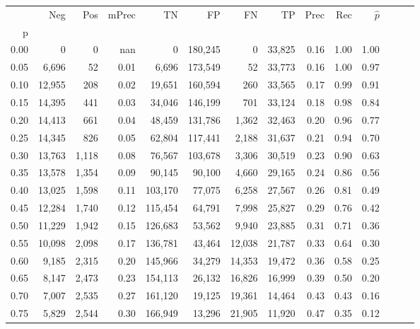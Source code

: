 \begin{tabular}{rrrrrrrrrrrrrr}
\toprule
{} &     Neg &    Pos & mPrec &       TN &       FP &      FN &      TP &  Prec &   Rec & $\hat{p}$ \\
p    &         &        &       &          &          &         &         &       &       &           \\
\midrule
0.00 &       0 &      0 &   nan &        0 &  180,245 &       0 &  33,825 &  0.16 &  1.00 &      1.00 \\
0.05 &   6,696 &     52 &  0.01 &    6,696 &  173,549 &      52 &  33,773 &  0.16 &  1.00 &      0.97 \\
0.10 &  12,955 &    208 &  0.02 &   19,651 &  160,594 &     260 &  33,565 &  0.17 &  0.99 &      0.91 \\
0.15 &  14,395 &    441 &  0.03 &   34,046 &  146,199 &     701 &  33,124 &  0.18 &  0.98 &      0.84 \\
0.20 &  14,413 &    661 &  0.04 &   48,459 &  131,786 &   1,362 &  32,463 &  0.20 &  0.96 &      0.77 \\
0.25 &  14,345 &    826 &  0.05 &   62,804 &  117,441 &   2,188 &  31,637 &  0.21 &  0.94 &      0.70 \\
0.30 &  13,763 &  1,118 &  0.08 &   76,567 &  103,678 &   3,306 &  30,519 &  0.23 &  0.90 &      0.63 \\
0.35 &  13,578 &  1,354 &  0.09 &   90,145 &   90,100 &   4,660 &  29,165 &  0.24 &  0.86 &      0.56 \\
0.40 &  13,025 &  1,598 &  0.11 &  103,170 &   77,075 &   6,258 &  27,567 &  0.26 &  0.81 &      0.49 \\
0.45 &  12,284 &  1,740 &  0.12 &  115,454 &   64,791 &   7,998 &  25,827 &  0.29 &  0.76 &      0.42 \\
0.50 &  11,229 &  1,942 &  0.15 &  126,683 &   53,562 &   9,940 &  23,885 &  0.31 &  0.71 &      0.36 \\
0.55 &  10,098 &  2,098 &  0.17 &  136,781 &   43,464 &  12,038 &  21,787 &  0.33 &  0.64 &      0.30 \\
0.60 &   9,185 &  2,315 &  0.20 &  145,966 &   34,279 &  14,353 &  19,472 &  0.36 &  0.58 &      0.25 \\
0.65 &   8,147 &  2,473 &  0.23 &  154,113 &   26,132 &  16,826 &  16,999 &  0.39 &  0.50 &      0.20 \\
0.70 &   7,007 &  2,535 &  0.27 &  161,120 &   19,125 &  19,361 &  14,464 &  0.43 &  0.43 &      0.16 \\
0.75 &   5,829 &  2,544 &  0.30 &  166,949 &   13,296 &  21,905 &  11,920 &  0.47 &  0.35 &      0.12 \\

\end{tabular}
